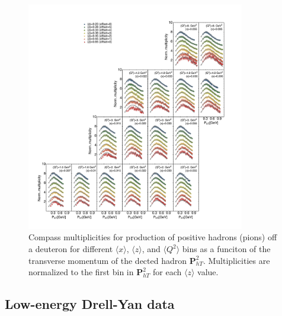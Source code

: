 \documentclass[aps,preprintnumbers,showpacs,nofootinbib,superscriptaddress,floatfix]{revtex4}
\begin{document}
\begin{figure}[h!]
\begin{center}
\includegraphics[width=0.85\textwidth]{plots/Compass/COMPASS_SCIplot_flINDEP_Piplus.pdf}
\end{center}
\caption{Compass multiplicities for production of positive hadrons (pions) off a deuteron for different $\langle x \rangle$, $\langle z \rangle$, and $\langle Q^2 \rangle$ bins as a funciton of the transverse momentum of the dected hadron ${\bm P}_{hT}^ 2$. Multiplicities are normalized to the first bin in ${\bm P}_{hT}^ 2$ for each $\langle z \rangle$ value.} 
\label{f:C_pip}
\end{figure}




\subsection{Low-energy Drell-Yan data}
\label{ss:dy}
\end{document}
